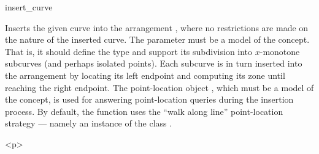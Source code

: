 
\ccRefPageBegin

\begin{ccRefFunction}{insert_curve}


   {Inserts the given curve  into the arrangement , where
    no restrictions are made on the nature of the inserted curve.
    The  parameter must be a model of the
    concept. That is, it should define the  type and support
    its subdivision into $x$-monotone subcurves (and perhaps isolated points).
    Each subcurve is in turn inserted into the arrangement by locating its
    left endpoint and computing its zone until reaching the right endpoint.
    The point-location object , which must be a model of the
     concept, is used for answering
    point-location queries during the insertion process.
    By default, the function uses the ``walk along line'' point-location
    strategy --- namely an instance of the class
    .
    }


\begin{ccHtmlOnly}<p>\end{ccHtmlOnly}


\end{ccRefFunction}

